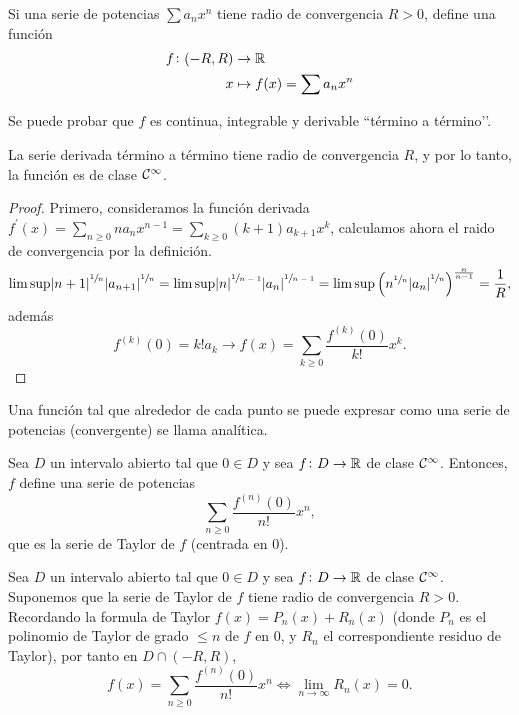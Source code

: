 \begin{defi}
    Si una serie de potencias $\sum a_n x^n$ tiene radio de convergencia $R > 0$,
    define una función
    \[\begin{aligned}
        f \colon (-R,R) &\to \mathbb{R} \\ x &\mapsto f(x) = \sum a_n x^n
    \end{aligned}\]
\end{defi}

\begin{obs*}
    Se puede probar que $f$ es continua, integrable y derivable
    ``término a término’’.
\end{obs*}

\begin{obs*}
    La serie derivada término a término tiene radio de convergencia $R$, y por
    lo tanto, la función es de clase $\mathcal{C}^\infty$.
\end{obs*}

\begin{proof}
    Primero, consideramos la función derivada $f^\prime (x) = \sum\limits_{n \geq 0}
    n a_n x^{n-1} = \sum\limits_{k \geq 0} (k+1) a_{k+1} x^k$, calculamos ahora
    el raido de convergencia por la definición.
    \[
        \limsup \abs{n+1}^{\sfrac{1}{n}}\abs{a_{n+1}}^{\sfrac{1}{n}} =
        \limsup \abs{n}^{\sfrac{1}{n-1}}\abs{a_{n}}^{\sfrac{1}{n-1}} =
        \limsup \left( n^{\sfrac{1}{n}} \abs{a_n}^{\sfrac{1}{n}} \right)^
        {\frac{n}{n-1}} = \frac{1}{R},
    \]
    además
    \[
        f^{(k)}(0) = k! a_k \rightarrow f(x) = \sum_{k \geq 0} \frac{f^{(k)}(0)}
        {k!}x^k.
    \]
\end{proof}

\begin{defi*}
    Una función tal que alrededor de cada punto se puede expresar como una serie
    de potencias (convergente) se llama analítica.
\end{defi*}

\begin{defi}
    Sea $D$ un intervalo abierto tal que $0 \in D$ y sea $f \colon D \to \mathbb{R}$
    de clase $\mathcal{C}^\infty$. Entonces, $f$ define una serie de potencias
    \[
        \sum_{n \geq 0} \frac{f^{(n)}(0)}{n!} x^n,
    \]
    que es la serie de Taylor de $f$ (centrada en 0).
\end{defi}

\begin{prop*}
    Sea $D$ un intervalo abierto tal que $0 \in D$ y sea $f \colon D \to \mathbb{R}$
    de clase $\mathcal{C}^\infty$. Suponemos que la serie de Taylor de $f$ tiene radio
    de convergencia $R > 0$. Recordando la formula de Taylor $f(x) = P_n(x) + R_n(x)$
    (donde $P_n$ es el polinomio de Taylor de grado $\leq n$ de $f$ en 0, y $R_n$
    el correspondiente residuo de Taylor), por tanto en $D \cap (-R,R)$,
    \[
        f(x) = \sum_{n \geq 0} \frac{f^{(n)}(0)}{n!}x^n \iff
        \lim_{n \to \infty} R_n(x) = 0.
    \]
\end{prop*}

